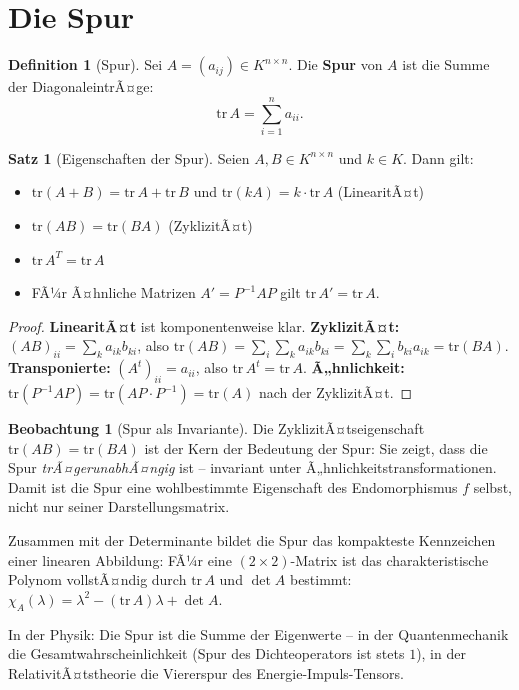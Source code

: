 ﻿\documentclass[a4paper,12pt]{report}
\theoremstyle{definition}
\newtheorem{definition}{Definition}
\newtheorem{satz}{Satz}
\newtheorem{beobachtung}{Beobachtung}
\begin{document}
\section{Die Spur}

\begin{definition}[Spur]
    Sei $A = (a_{ij}) \in K^{n \times n}$. Die \textbf{Spur} von $A$ ist
    die Summe der DiagonaleintrÃ¤ge:
    \[
        \mathrm{tr}\, A = \sum_{i=1}^n a_{ii}.
    \]
\end{definition}

\begin{satz}[Eigenschaften der Spur]
    Seien $A, B \in K^{n \times n}$ und $k \in K$. Dann gilt:
    \begin{itemize}
        \item[-] $\mathrm{tr}(A + B) = \mathrm{tr}\, A + \mathrm{tr}\, B$
              und $\mathrm{tr}(kA) = k \cdot \mathrm{tr}\, A$
              \quad (LinearitÃ¤t)
        \item[-] $\mathrm{tr}(AB) = \mathrm{tr}(BA)$
              \quad (ZyklizitÃ¤t)
        \item[-] $\mathrm{tr}\, A^T = \mathrm{tr}\, A$
        \item[-] FÃ¼r Ã¤hnliche Matrizen $A' = P^{-1}AP$ gilt
              $\mathrm{tr}\, A' = \mathrm{tr}\, A$.
    \end{itemize}
\end{satz}
\begin{proof}
    \textbf{LinearitÃ¤t} ist komponentenweise klar.
    \textbf{ZyklizitÃ¤t:} $(AB)_{ii} = \sum_k a_{ik} b_{ki}$, also
    $\mathrm{tr}(AB) = \sum_i \sum_k a_{ik} b_{ki} = \sum_k \sum_i b_{ki} a_{ik}
    = \mathrm{tr}(BA)$.
    \textbf{Transponierte:} $(A^t)_{ii} = a_{ii}$, also $\mathrm{tr}\, A^t = \mathrm{tr}\, A$.
    \textbf{Ã„hnlichkeit:} $\mathrm{tr}(P^{-1}AP) = \mathrm{tr}(AP \cdot P^{-1})
    = \mathrm{tr}(A)$ nach der ZyklizitÃ¤t.
\end{proof}


\begin{beobachtung}[Spur als Invariante]
    Die ZyklizitÃ¤tseigenschaft $\mathrm{tr}(AB) = \mathrm{tr}(BA)$ ist
    der Kern der Bedeutung der Spur: Sie zeigt, dass die Spur
    \emph{trÃ¤gerunabhÃ¤ngig} ist -- invariant unter Ã„hnlichkeitstransformationen.
    Damit ist die Spur eine wohlbestimmte Eigenschaft des Endomorphismus
    $f$ selbst, nicht nur seiner Darstellungsmatrix.

    Zusammen mit der Determinante bildet die Spur das kompakteste
    Kennzeichen einer linearen Abbildung: FÃ¼r eine $(2 \times 2)$-Matrix ist
    das charakteristische Polynom vollstÃ¤ndig durch $\mathrm{tr}\, A$ und
    $\det A$ bestimmt:
    $\chi_A(\lambda) = \lambda^2 - (\mathrm{tr}\, A)\lambda + \det A$.

    In der Physik: Die Spur ist die Summe der Eigenwerte -- in der
    Quantenmechanik die Gesamtwahrscheinlichkeit (Spur des Dichteoperators
    ist stets $1$), in der RelativitÃ¤tstheorie die Viererspur des
    Energie-Impuls-Tensors.
\end{beobachtung}
\end{document}
